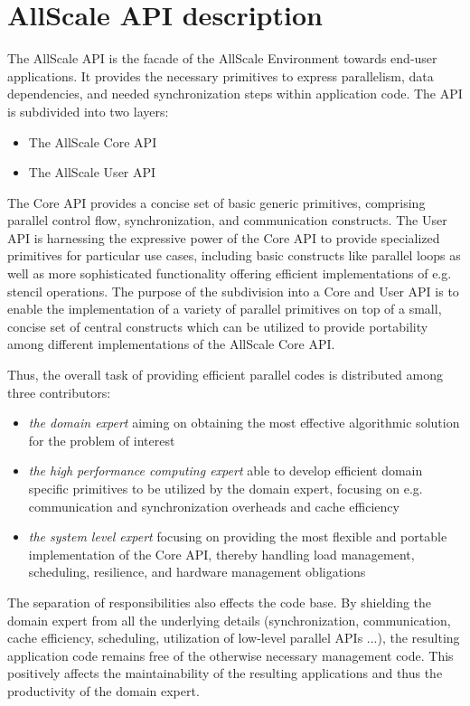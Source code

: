 \documentclass[acmsmall,review,anonymous]{acmart}\settopmatter{printfolios=true,printccs=false,printacmref=false}
\begin{document}
\section{AllScale API description}
\label{sec:API}
The AllScale API is the facade of the AllScale Environment towards end-user applications. It provides the necessary primitives to express parallelism, data dependencies, and needed synchronization steps within application code. The
API is subdivided into two layers:
\begin{itemize}
\item The AllScale Core API
\item The AllScale User API
\end{itemize}
The Core API provides a concise set of basic generic primitives, comprising
parallel control flow, synchronization, and communication constructs. The User
API is harnessing the expressive power of the Core API to provide specialized
primitives for particular use cases, including basic constructs like parallel loops
as well as more sophisticated functionality offering efficient implementations of
e.g. stencil operations.
The purpose of the subdivision into a Core and User API is to enable the
implementation of a variety of parallel primitives on top of a small, concise set of
central constructs which can be utilized to provide portability among different
implementations of the AllScale Core API.

Thus, the overall task of
providing efficient parallel codes is distributed among three contributors:
\begin{itemize}
\item \textit{the domain expert} aiming on obtaining the most effective algorithmic solution for the problem of interest
\item \textit{the high performance computing expert} able to develop efficient domain specific primitives to be utilized by the domain expert, focusing on e.g. communication and synchronization overheads and cache efficiency
\item \textit{the system level expert} focusing on providing the most flexible and portable implementation of the Core API, thereby handling load management, scheduling, resilience, and hardware management obligations
\end{itemize}

The separation of responsibilities also effects the code base. By shielding the
domain expert from all the underlying details (synchronization, communication,
cache efficiency, scheduling, utilization of low-level parallel APIs ...), the
resulting application code remains free of the otherwise necessary management
code. This positively affects the maintainability of the resulting applications and
thus the productivity of the domain expert.
\end{document}
